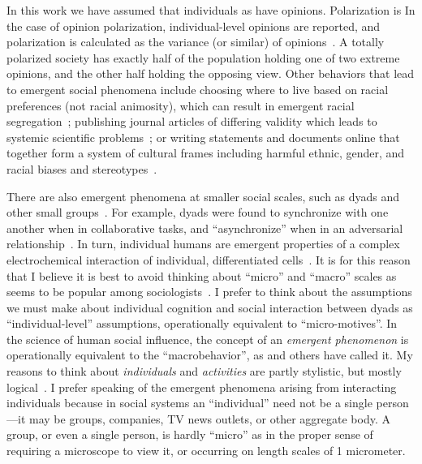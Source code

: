 \documentclass[12pt,letterpaper]{article}
\begin{document}
In this work we have assumed that individuals as have opinions. Polarization is 
In the case of opinion polarization, 
individual-level opinions are reported, and polarization is calculated 
as the variance (or similar) of opinions~\cite{Bramson2016}. A totally polarized society has
exactly half of the population holding one of two extreme opinions, and the
other half holding the opposing view. 
Other behaviors that lead to emergent social phenomena 
include choosing where to live based on racial preferences (not racial animosity), 
which can result in emergent racial segregation~\cite{Schelling1971}; publishing journal 
articles of differing validity which leads to systemic scientific problems~\cite{Smaldino2019};
or writing statements and documents online that together form a system of 
cultural frames including harmful ethnic, gender, and racial biases and 
stereotypes~\cite{Caliskan2017,Garg2018}. 

There are also emergent phenomena
at smaller social scales, such as dyads and other small groups~\cite{Abney2014a}. 
For example, dyads were found to synchronize with one another when in collaborative
tasks, and ``asynchronize'' when in an adversarial 
relationship~\cite{Abney2014,Ramirez-Aristizabal2018,Schloesser2019,Schneider2020,Abney2021}.
In turn, individual humans are emergent properties of a complex electrochemical
interaction of individual, differentiated cells~\cite{Schrodinger19??,Kello2007,Lazer2009}.
It is for this reason that I believe it is best to avoid thinking about
``micro'' and ``macro'' scales as seems to be popular among 
sociologists~\cite{Macy2002,Schelling2006}. I prefer to think about the assumptions
we must make about individual cognition and social interaction between dyads
as ``individual-level'' assumptions, operationally equivalent to ``micro-motives''.
In the science of human social influence, the concept of an \emph{emergent phenomenon} is operationally equivalent to 
the ``macrobehavior'', as  and others have called it.  
My reasons to think about \emph{individuals} and \emph{activities} 
are partly stylistic, but mostly logical~\cite{Machamer2000}.
I prefer speaking of the emergent phenomena arising from interacting
individuals because in social systems an ``individual'' need not be a single
person---it may be groups, companies, TV news outlets, or other aggregate 
body. A group, or even a single person, is hardly ``micro'' as in the proper sense of requiring
a microscope to view it, or occurring on length scales of 1 micrometer.
\end{document}
